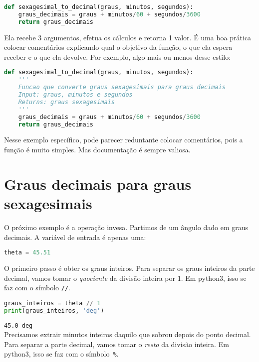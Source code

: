 \begin{lstlisting}[language=Python]
def sexagesimal_to_decimal(graus, minutos, segundos):
    graus_decimais = graus + minutos/60 + segundos/3600
    return graus_decimais
\end{lstlisting}

\noindent Ela recebe 3 argumentos, efetua os cálculos e retorna 1 valor. É uma boa prática colocar comentários explicando qual o objetivo da função, o que ela espera receber e o que ela devolve. Por exemplo, algo mais ou menos desse estilo:

\begin{lstlisting}[language=Python]
def sexagesimal_to_decimal(graus, minutos, segundos):
    '''
    Funcao que converte graus sexagesimais para graus decimais
    Input: graus, minutos e segundos
    Returns: graus sexagesimais
    '''
    graus_decimais = graus + minutos/60 + segundos/3600
    return graus_decimais
\end{lstlisting}

\noindent Nesse exemplo específico, pode parecer reduntante colocar comentários, pois a função é muito simples. Mas documentação é sempre valiosa.

\section{Graus decimais para graus sexagesimais}

O próximo exemplo é a operação invesa. Partimos de um ângulo dado em graus decimais. A variável de entrada é apenas uma:

\begin{lstlisting}[language=Python]
theta = 45.51
\end{lstlisting}

\noindent O primeiro passo é obter os graus inteiros. Para separar os graus inteiros da parte decimal, vamos tomar o \textit{quociente} da divisão inteira por 1. Em python3, isso se faz com o símbolo \texttt{//}.

\begin{lstlisting}[language=Python]
graus_inteiros = theta // 1
print(graus_inteiros, 'deg')
\end{lstlisting}
\noindent\texttt{45.0 deg}\\

\noindent Precisamos extrair minutos inteiros daquilo que sobrou depois do ponto decimal. Para separar a parte decimal, vamos tomar o \textit{resto} da divisão inteira. Em python3, isso se faz com
o símbolo~\texttt{\%}.

